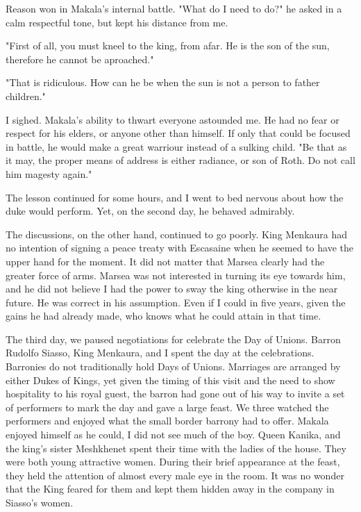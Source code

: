 \documentclass{article}
\begin{document}
Reason won in Makala's internal battle. "What do I need to do?" he asked in a calm respectful tone, but kept his distance from me.

"First of all, you must kneel to the king, from afar. He is the son of the sun, therefore he cannot be aproached."

"That is ridiculous. How can he be when the sun is not a person to father children."

I sighed. Makala's ability to thwart everyone astounded me. He had no fear or respect for his elders, or anyone other than himself. If only that could be focused in battle, he would make a great warriour instead of a sulking child. "Be that as it may, the proper means of address is either radiance, or son of Roth. Do not call him magesty again."

The lesson continued for some hours, and I went to bed nervous about how the duke would perform. Yet, on the second day, he behaved admirably.

The discussions, on the other hand, continued to go poorly. King Menkaura had no intention of signing a peace treaty with Escasaine when he seemed to have the upper hand for the moment. It did not matter that Marsea clearly had the greater force of arms. Marsea was not interested in turning its eye towards him, and he did not believe I had the power to sway the king otherwise in the near future. He was correct in his assumption. Even if I could in five years, given the gains he had already made, who knows what he could attain in that time. 

The third day, we paused negotiations for celebrate the Day of Unions. Barron Rudolfo Siasso, King Menkaura, and I spent the day at the celebrations. Barronies do not traditionally hold Days of Unions. Marriages are arranged by either Dukes of Kings, yet given the timing of this visit and the need to show hospitality to his royal guest, the barron had gone out of his way to invite a set of performers to mark the day and gave a large feast. We three watched the performers and enjoyed what the small border barrony had to offer. Makala enjoyed himself as he could, I did not see much of the boy.  Queen Kanika, and the king's sister Meshkhenet spent their time with the ladies of the house. They were both young attractive women. During their brief appearance at the feast, they held the attention of almost every male eye in the room. It was no wonder that the King feared for them and kept them hidden away in the company in Siasso's women.
\end{document}
